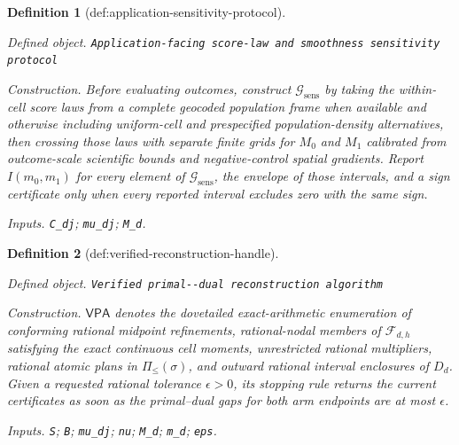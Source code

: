 \documentclass{article}
\newtheorem{definition}{Definition}
\begin{document}
\begin{definition}[def:application-sensitivity-protocol]\label{def:application-sensitivity-protocol}
\par\smallskip\noindent\emph{Defined object.} \texttt{Application-\allowbreak{}facing score-\allowbreak{}law and smoothness sensitivity protocol}
\par\smallskip\noindent\emph{Construction.} Before evaluating outcomes, construct \(\mathcal G_{\mathrm{sens}}\) by taking the within-cell score laws from a complete geocoded population frame when available and otherwise including uniform-cell and prespecified population-density alternatives, then crossing those laws with separate finite grids for \(M_0\) and \(M_1\) calibrated from outcome-scale scientific bounds and negative-control spatial gradients. Report \(I(m_0,m_1)\) for every element of \(\mathcal G_{\mathrm{sens}}\), the envelope of those intervals, and a sign certificate only when every reported interval excludes zero with the same sign.
\par\smallskip\noindent\emph{Inputs.} \texttt{C\_\allowbreak{}dj}; \texttt{mu\_\allowbreak{}dj}; \texttt{M\_\allowbreak{}d}.
\end{definition}

\begin{definition}[def:verified-reconstruction-handle]\label{def:verified-reconstruction-handle}
\par\smallskip\noindent\emph{Defined object.} \texttt{Verified primal-\allowbreak{}-\allowbreak{}dual reconstruction algorithm}
\par\smallskip\noindent\emph{Construction.} \(\mathsf{VPA}\) denotes the dovetailed exact-arithmetic enumeration of conforming rational midpoint refinements, rational-nodal members of \(\mathcal F_{d,h}\) satisfying the exact continuous cell moments, unrestricted rational multipliers, rational atomic plans in \(\Pi_{\le}(\sigma)\), and outward rational interval enclosures of \(D_d\).  Given a requested rational tolerance \(\epsilon>0\), its stopping rule returns the current certificates as soon as the primal--dual gaps for both arm endpoints are at most \(\epsilon\).
\par\smallskip\noindent\emph{Inputs.} \texttt{S}; \texttt{B}; \texttt{mu\_\allowbreak{}dj}; \texttt{nu}; \texttt{M\_\allowbreak{}d}; \texttt{m\_\allowbreak{}d}; \texttt{eps}.
\end{definition}
\end{document}
